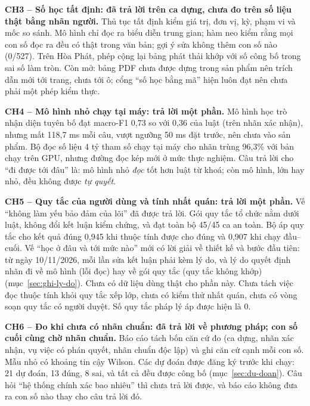 \textbf{CH3 – Số học tất định: đã trả lời trên ca dựng, chưa đo trên số liệu thật bằng nhãn người.} Thủ tục tất định kiểm giá trị, đơn vị, kỳ, phạm vi và mốc so sánh. Mô hình chỉ đọc ra biểu diễn trung gian; hàm neo kiểm rằng mọi con số đọc ra đều có thật trong văn bản; gợi ý sửa không thêm con số nào (0/527). Trên Hòa Phát, phép cộng lại bảng phát thải khớp với số công bố trong sai số làm tròn. Còn mở: bảng PDF chưa được dựng trong sản phẩm nên trích dẫn mới tới trang, chưa tới ô; cổng “số học bằng mã” hiện luôn đạt nên chưa phải một phép kiểm thực.

\textbf{CH4 – Mô hình nhỏ chạy tại máy: trả lời một phần.} Mô hình học trò nhận diện tuyên bố đạt macro-F1 0,73 so với 0,36 của luật (trên nhãn xác nhận), nhưng mất 118,7 ms mỗi câu, vượt ngưỡng 50 ms đặt trước, nên chưa vào sản phẩm. Bộ đọc số liệu 4 tỷ tham số chạy tại máy cho nhãn trùng 96,3\% với bản chạy trên GPU, nhưng đường đọc kép mới ở mức thực nghiệm. Câu trả lời cho “đi được tới đâu” là: mô hình nhỏ \emph{đọc} tốt hơn luật từ khoá; còn mô hình, lớn hay nhỏ, đều không được \emph{tự quyết}.

\textbf{CH5 – Quy tắc của người dùng và tính nhất quán: trả lời một phần.} Vế “không làm yếu bảo đảm của lõi” đã được trả lời. Gói quy tắc tổ chức nằm dưới luật, không đổi kết luận kiểm chứng, và đạt toàn bộ 45/45 ca an toàn. Bộ áp quy tắc cho kết quả đúng 0,945 khi thuộc tính được cho đúng và 0,907 khi chạy đầu–cuối. Vế “học ở đâu và tới mức nào” mới có lời giải về thiết kế và bước đầu tiên: từ ngày 10/11/2026, mỗi lần sửa kết luận phải kèm lý do, và lý do quyết định nhãn đi về mô hình (lỗi đọc) hay về gói quy tắc (quy tắc không khớp) (mục~\ref{sec:ghi-ly-do}). Chưa có dữ liệu dùng thật cho phần này. Chưa tách việc đọc thuộc tính khỏi quy tắc xếp lớp, chưa có kiểm thử nhất quán, chưa có vòng soạn quy tắc có người duyệt. Số quy tắc pháp lý áp được hiện là 0.

\textbf{CH6 – Đo khi chưa có nhãn chuẩn: đã trả lời về phương pháp; con số cuối cùng chờ nhãn chuẩn.} Báo cáo tách bốn căn cứ đo (ca dựng, nhãn xác nhận, vụ việc có phán quyết, nhãn chuẩn độc lập) và ghi căn cứ cạnh mỗi con số. Mẫu nhỏ có khoảng tin cậy Wilson. Các dự đoán được đăng ký trước khi chạy: 21 dự đoán, 13 đúng, 8 sai, và tất cả đều được công bố (mục~\ref{sec:du-doan}). Câu hỏi “hệ thống chính xác bao nhiêu” thì chưa trả lời được, và báo cáo không đưa ra con số nào thay cho câu trả lời đó.

